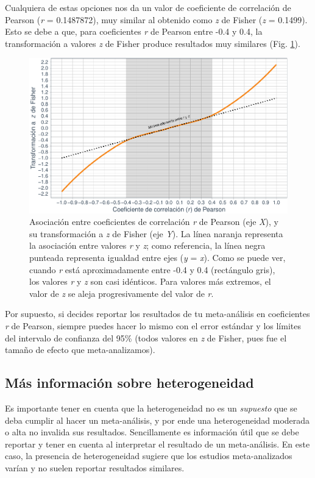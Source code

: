\documentclass[
  bookmarksnumbered]{article}
\begin{document}
Cualquiera de estas opciones nos da un valor de coeficiente de correlación de Pearson (\emph{r} = 0.1487872), muy similar al obtenido como \emph{z} de Fisher (\emph{z} = 0.1499). Esto se debe a que, para coeficientes \emph{r} de Pearson entre -0.4 y 0.4, la transformación a valores \emph{z} de Fisher produce resultados muy similares (Fig. \ref{fig:rvsz}).

\begin{figure}
\centering
\includegraphics{Meta-analysis_files/figure-latex/rvsz-1.pdf}
\caption{\label{fig:rvsz}Asociación entre coeficientes de correlación \emph{r} de Pearson (eje \emph{X}), y su transformación a \emph{z} de Fisher (eje \emph{Y}). La línea naranja representa la asociación entre valores \emph{r} y \emph{z}; como referencia, la línea negra punteada representa igualdad entre ejes (\emph{y} = \emph{x}). Como se puede ver, cuando \emph{r} está aproximadamente entre -0.4 y 0.4 (rectángulo gris), los valores \emph{r} y \emph{z} son casi idénticos. Para valores más extremos, el valor de \emph{z} se aleja progresivamente del valor de \emph{r}.}
\end{figure}

Por supuesto, si decides reportar los resultados de tu meta-análisis en coeficientes \emph{r} de Pearson, siempre puedes hacer lo mismo con el error estándar y los límites del intervalo de confianza del 95\% (todos valores en \emph{z} de Fisher, pues fue el tamaño de efecto que meta-analizamos).

\hypertarget{heterog-inf}{%
\subsection{Más información sobre heterogeneidad}\label{heterog-inf}}

Es importante tener en cuenta que la heterogeneidad no es un \emph{supuesto} que se deba cumplir al hacer un meta-análisis, y por ende una heterogeneidad moderada o alta no invalida sus resultados. Sencillamente es información útil que se debe reportar y tener en cuenta al interpretar el resultado de un meta-análisis. En este caso, la presencia de heterogeneidad sugiere que los estudios meta-analizados varían y no suelen reportar resultados similares.
\end{document}
